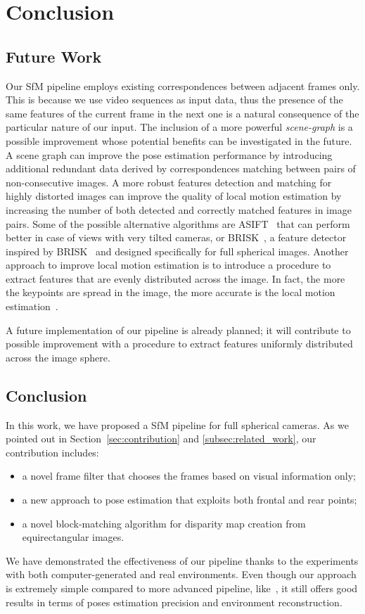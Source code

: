 \chapter{Conclusion}
%
\section{Future Work}
Our SfM pipeline employs existing correspondences between adjacent frames only.
This is because we use video sequences as input data, thus the presence of
the same features of the current frame in the next one is a natural consequence
of the particular nature of our input.
The inclusion of a more powerful \emph{scene-graph} is a possible improvement
whose potential benefits can be investigated in the future.
A scene graph can improve the pose estimation
performance by introducing additional redundant data derived by 
correspondences matching between pairs of non-consecutive images.
A more robust features detection and matching for highly distorted images
can improve the quality of local motion estimation by increasing the number
of both detected and correctly matched features in image pairs.
Some of the possible alternative algorithms are ASIFT~\cite{morel2009asift}
that can perform better in case of views with very tilted cameras,
or BRISK~\cite{guan2017brisks}, a feature detector inspired by
BRISK~\cite{leutenegger2011brisk} and designed specifically for full spherical
images.
Another approach to improve local motion estimation is to
introduce a procedure to extract
features that are evenly distributed across the image. In fact, the more the
keypoints are spread in the image, the more accurate is the local motion
estimation~\cite{irschara2009structure,schonberger2016structure}.

A future implementation of our pipeline is already planned; it will contribute
to possible improvement with a procedure to extract features uniformly
distributed across the image sphere. 

\section{Conclusion}
In this work, we have proposed a SfM pipeline for full spherical cameras.
As we pointed out in Section~\ref{sec:contribution} and
\ref{subsec:related_work}, our contribution includes:
\begin{itemize}
	\item a novel frame filter that chooses the frames based on visual
	information only;
	\item a new approach to pose estimation that exploits both frontal and rear
	points;
	\item a novel block-matching algorithm for disparity map creation from
	equirectangular images.
\end{itemize}
We have demonstrated the effectiveness of our pipeline thanks to the
experiments with both computer-generated and real environments.
Even though our approach is extremely simple compared to more advanced pipeline,
like~\cite{schonberger2016structure}, it still offers good results in terms of
poses estimation precision and environment reconstruction.
